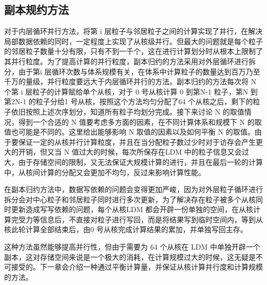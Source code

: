 \subsection{副本规约方法}
对于内层循环并行方法，将第 i 层粒子与邻居粒子之间的计算实现了并行，在解决局部数据依赖的同时，一定程度上实现了从核级并行。但最大的问题就是每个粒子的邻居粒子数量十分有限，只有不到一千个，这在进行计算划分时从根本上限制了其并行粒度。为了提高计算的并行粒度，副本归约的方法采用对外层循环进行拆分，由于第i 层循环次数与体系规模有关，在体系中计算粒子的数量达到百万乃至千万的量级，并行粒度要远大于内层循环并行的方法。副本归约的方法每次将 N 个第 i 层粒子的计算赋给单个从核，对于 0 号从核计算 0 到第N-1 粒子，第N 到第2N-1 的粒子分给1 号从核，按照这个方法均匀分配了64 个从核之后，剩下的粒子依旧按照上述次序划分，知道所有粒子均划分完成。接下来讨论 N 的取值情况，得到一个合适的 N 值要考虑多方面的因素，在不同计算体系和规模下 N 的取值也可能是不同的。这里给出能够影响 N 取值的因素以及如何平衡 N 的取值。由于要保证一定的从核并行计算粒度，并且在当分配粒子数过少时对于访存会产生更大的开销，但又当 N 值过大的时候，每次所保存在LDM 中的粒子信息又会过大，由于存储空间的限制，又无法保证大规模计算的进行，并且在最后一轮的计算中，从核间计算的分配又会更加不均匀，反过来影响计算性能。

在副本归约方法中，数据写依赖的问题会变得更加严峻，因为对外层粒子循环进行拆分会对中心粒子和邻居粒子同时进行多次更新，为了解决存在粒子被多个从核同时更新造成写写依赖的问题，每个从核LDM 都会开辟一份单独的空间，在从核计算完受力等信息后，不直接对粒子进行写回，而是将结果写到临时空间内，等到从核此轮计算全部结束后，由0 号从核完成计算结果的累加，并单独写回主存。

这种方法虽然能够提高并行性，但由于需要为 64 个从核在 LDM 中单独开辟一个副本，这对存储空间来说是一个极大的消耗，在计算规模过大的时候，这无疑是不可接受的。下一章会介绍一种通过平衡计算量，并保证从核计算并行度和计算规模的方法。
